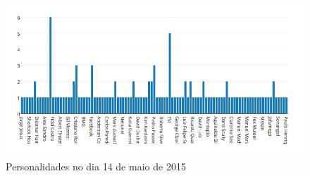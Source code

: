 \begin{figure}[htbp]
    \centering
    \includegraphics[width=1\textwidth]{images/search55.png} %
    \caption{Personalidades no dia 14 de maio de 2015}
\end{figure}

